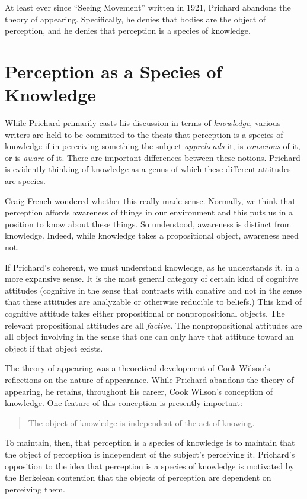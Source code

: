 \documentclass[11pt]{article}
\begin{document}
At least ever since ``Seeing Movement'' written in 1921, Prichard abandons the theory of appearing. Specifically, he denies that bodies are the object of perception, and he denies that perception is a species of knowledge.

\section{Perception as a Species of Knowledge} %
\label{sec:perception_as_a_species_of_knowledge}
While Prichard primarily casts his discussion in terms of \emph{knowledge}, various writers are held to be committed to the thesis that perception is a species of knowledge if in perceiving something the subject \emph{apprehends} it, is \emph{conscious} of it, or is \emph{aware} of it. There are important differences between these notions. Prichard is evidently thinking of knowledge as a genus of which these different attitudes are species.

\begin{discussion}
    Craig French wondered whether this really made sense. Normally, we think that perception affords awareness of things in our environment and this puts us in a position to know about these things. So understood, awareness is distinct from knowledge. Indeed, while knowledge takes a propositional object, awareness need not. 
    
    If Prichard's coherent, we must understand knowledge, as he understands it, in a more expansive sense. It is the most general category of certain kind of cognitive attitudes (cognitive in the sense that contrasts with conative and not in the sense that these attitudes are analyzable or otherwise reducible to beliefs.) This kind of cognitive attitude takes either propositional or nonpropositional objects. The relevant propositional attitudes are all \emph{factive}. The nonpropositional attitudes are all object involving in the sense that one can only have that attitude toward an object if that object exists.
\end{discussion}

The theory of appearing was a theoretical development of Cook Wilson's reflections on the nature of appearance. While Prichard abandons the theory of appearing, he retains, throughout his career, Cook Wilson's conception of knowledge. One feature of this conception is presently important:
\begin{quote}
    The object of knowledge is independent of the act of knowing.
\end{quote}
To maintain, then, that perception is a species of knowledge is to maintain that the object of perception is independent of the subject's perceiving it. Prichard's opposition to the idea that perception is a species of knowledge is motivated by the Berkelean contention that the objects of perception are dependent on perceiving them.
\end{document}
